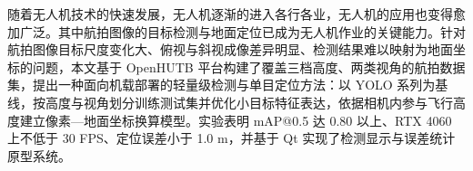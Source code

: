 \begin{abstractzh}

随着无人机技术的快速发展，无人机逐渐的进入各行各业，无人机的应用也变得愈加广泛。其中航拍图像的目标检测与地面定位已成为无人机作业的关键能力。针对航拍图像目标尺度变化大、俯视与斜视成像差异明显、检测结果难以映射为地面坐标的问题，本文基于 OpenHUTB 平台构建了覆盖三档高度、两类视角的航拍数据集，提出一种面向机载部署的轻量级检测与单目定位方法：以 YOLO 系列为基线，按高度与视角划分训练测试集并优化小目标特征表达，依据相机内参与飞行高度建立像素—地面坐标换算模型。实验表明 mAP@0.5 达 0.80 以上、RTX 4060 上不低于 30 FPS、定位误差小于 1.0 m，并基于 Qt 实现了检测显示与误差统计原型系统。


\end{abstractzh}

